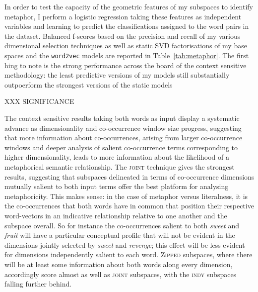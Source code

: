 In order to test the capacity of the geometric features of my subspaces to identify metaphor, I perform a logistic regression taking these features as independent variables and learning to predict the classifications assigned to the word pairs in the dataset.  Balanced f-scores based on the precision and recall of my various dimensional selection techniques as well as static SVD factorisations of my base spaces and the \texttt{word2vec} models are reported in Table~\ref{tab:metaphor}.  The first hing to note is the strong performance across the board of the context sensitive methodology: the least predictive versions of my models still substantially outpoerform the strongest versions of the static models

XXX SIGNIFICANCE

The context sensitive results taking both words as input display a systematic advance as dimensionality and co-occurrence window size progress, suggesting that more information about co-occurrences, arising from larger co-occurrence windows and deeper analysis of salient co-occurrence terms corresponding to higher dimensionality, leads to more information about the likelihood of a metaphorical semantic relationship.  The \textsc{joint} technique gives the strongest results, suggesting that subspaces delineated in terms of co-occurrence dimensions mutually salient to both input terms offer the best platform for analysing metaphoricity.  This makes sense: in the case of metaphor versus literalness, it is the co-occurrences that both words have in common that position their respective word-vectors in an indicative relationship relative to one another and the subspace overall.  So for instance the co-occurrences salient to both \emph{sweet} and \emph{fruit} will have a particular conceptual profile that will not be evident in the dimensions jointly selected by \emph{sweet} and \emph{revenge}; this effect will be less evident for dimensions independently salient to each word.  \textsc{Zipped} subspaces, where there will be at least some information about both words along every dimension, accordingly score almost as well as \textsc{joint} subspaces, with the \textsc{indy} subspaces falling further behind.

